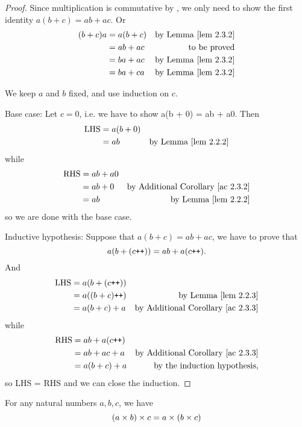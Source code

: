 \begin{proof}
Since multiplication is commutative by , we only need to show the first identity \(a(b + c)= ab + ac\). Or
\begin{align*}
    (b + c)a & = a(b + c) & \text{by \LEM{2.3.2}} \\
             & = ab + ac  & \text{to be proved} \\
             & = ba + ac  & \text{by \LEM{2.3.2}} \\
             & = ba + ca  & \text{by \LEM{2.3.2}}
\end{align*}

We keep \(a\) and \(b\) fixed, and use induction on \(c\).

Base case: Let \(c = 0\), i.e. we have to show a(b + 0) = ab + a0. Then
\begin{align*}
    \text{LHS} & = a(b + 0) \\
        & = ab & \text{by \LEM{2.2.2}}
\end{align*}
while
\begin{align*}
    \text{RHS} & = ab + a0 \\
        & = ab + 0 & \text{by \AC{2.3.2}} \\
        & = ab & \text{by \LEM{2.2.2}}
\end{align*}
so we are done with the base case.

Inductive hypothesis: Suppose that \(a(b + c) = ab + ac\), we have to prove that
\[a(b + (c\texttt{++})) = ab + a(c\texttt{++}).\]
And
\begin{align*}
    \text{LHS} & = a(b + (c\INC)) \\
               & = a((b + c)\INC) & \text{by \LEM{2.2.3}}\\
               & = a(b + c) + a & \text{by \AC{2.3.3}} \\
\end{align*}
while
\begin{align*}
    \text{RHS} & = ab + a(c\INC) \\
               & = ab + ac + a & \text{by \AC{2.3.3}} \\ 
               & = a(b + c)+ a & \text{by the induction hypothesis,} 
\end{align*}
so LHS = RHS and we can close the induction.
\end{proof}

\begin{proposition} \label{prop 2.3.5}
For any natural numbers \(a, b, c\), we have
\[(a \times b) \times c = a \times (b \times c)\]
\end{proposition}

